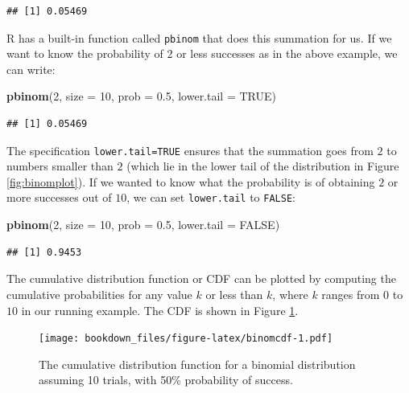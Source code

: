 \documentclass[12pt,]{krantz}
\newenvironment{Shaded}{\begin{snugshade}}{\end{snugshade}}
\newcommand{\DataTypeTok}[1]{\textcolor[rgb]{0.13,0.29,0.53}{#1}}
\newcommand{\DecValTok}[1]{\textcolor[rgb]{0.00,0.00,0.81}{#1}}
\newcommand{\FloatTok}[1]{\textcolor[rgb]{0.00,0.00,0.81}{#1}}
\newcommand{\KeywordTok}[1]{\textcolor[rgb]{0.13,0.29,0.53}{\textbf{#1}}}
\newcommand{\NormalTok}[1]{#1}
\newcommand{\OtherTok}[1]{\textcolor[rgb]{0.56,0.35,0.01}{#1}}
\begin{document}
\begin{verbatim}
## [1] 0.05469
\end{verbatim}

R has a built-in function called \texttt{pbinom} that does this summation for us. If we want to know the probability of \(2\) or less successes as in the above example, we can write:

\begin{Shaded}
\begin{Highlighting}[]
\KeywordTok{pbinom}\NormalTok{(}\DecValTok{2}\NormalTok{, }\DataTypeTok{size =} \DecValTok{10}\NormalTok{, }\DataTypeTok{prob =} \FloatTok{0.5}\NormalTok{, }\DataTypeTok{lower.tail =} \OtherTok{TRUE}\NormalTok{)}
\end{Highlighting}
\end{Shaded}

\begin{verbatim}
## [1] 0.05469
\end{verbatim}

The specification \texttt{lower.tail=TRUE} ensures that the summation goes from \(2\) to numbers smaller than \(2\) (which lie in the lower tail of the distribution in Figure \ref{fig:binomplot}). If we wanted to know what the probability is of obtaining \(2\) or more successes out of \(10\), we can set \texttt{lower.tail} to \texttt{FALSE}:

\begin{Shaded}
\begin{Highlighting}[]
\KeywordTok{pbinom}\NormalTok{(}\DecValTok{2}\NormalTok{, }\DataTypeTok{size =} \DecValTok{10}\NormalTok{, }\DataTypeTok{prob =} \FloatTok{0.5}\NormalTok{, }\DataTypeTok{lower.tail =} \OtherTok{FALSE}\NormalTok{)}
\end{Highlighting}
\end{Shaded}

\begin{verbatim}
## [1] 0.9453
\end{verbatim}

The cumulative distribution function or CDF can be plotted by computing the cumulative probabilities for any value \(k\) or less than \(k\), where \(k\) ranges from \(0\) to \(10\) in our running example. The CDF is shown in Figure \ref{fig:binomcdf}.

\begin{figure}
\centering
\texttt{[image: bookdown\_files/figure-latex/binomcdf-1.pdf]}
\caption{\label{fig:binomcdf}The cumulative distribution function for a binomial distribution assuming 10 trials, with 50\% probability of success.}
\end{figure}
\end{document}
